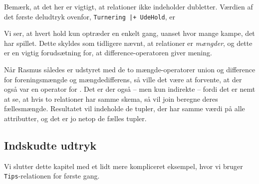 \documentclass{article}
\newcounter{eks}
\begin{document}

Bem\ae{}rk, at det her er vigtigt, at relationer ikke indeholder dubletter.
V\ae{}rdien af det f\o{}rste deludtryk ovenfor,
\verb"Turnering |+ UdeHold", er
\begin{center}
\end{center}
Vi ser, at hvert hold kun optr\ae{}der en enkelt gang, uanset hvor mange
kampe, det har spillet. Dette skyldes som tidligere n\ae{}vnt, at
relationer er {\em m\ae{}ngder}, og dette er en vigtig foruds\ae{}tning
for, at difference-operatoren giver mening.

N\aa{}r {\sc Rasmus} s\aa{}ledes er udstyret med de to m\ae{}ngde-operatorer
union og difference for foreningsm\ae{}ngde og m\ae{}ngdedifferens, s\aa{}
ville det v\ae{}re at forvente, at der ogs\aa{} var en operator for
. Det er der ogs\aa{} -- men kun indirekte -- fordi
det er nemt at se, at hvis to relationer har samme skema, s\aa{} vil
join beregne deres f\ae{}llesm\ae{}ngde. Resultatet vil indeholde
de tupler, der har samme v\ae{}rdi p\aa{} alle attributter, og det er jo
netop de f\ae{}lles tupler.

\subsection{Indskudte udtryk}
Vi slutter dette kapitel med et lidt mere kompliceret eksempel, hvor
vi bruger \verb"Tips"-relationen for f\o{}rste gang.

\end{document}
